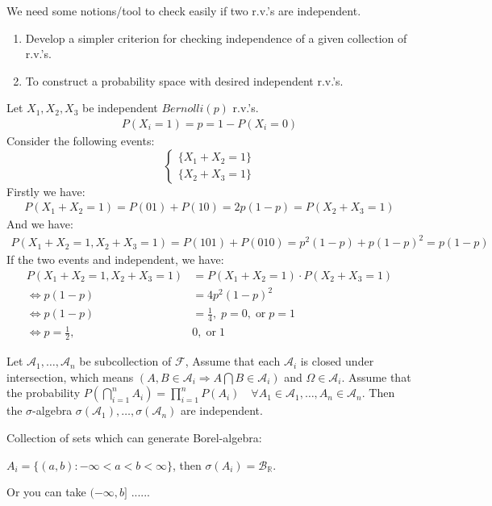 \documentclass[11pt]{article}
\begin{document}
We need some notions/tool to check easily if two r.v.'s are independent.
\begin{enumerate}
    \item Develop a simpler criterion for checking independence of a given collection of r.v.'s.
    \item To construct a probability space with desired independent r.v.'s.
\end{enumerate}

\begin{example}
    Let $X_1, X_2,X_3$ be independent $Bernolli(p)$ r.v.'s.
    \begin{align*}
        P(X_{i} = 1) = p = 1-P(X_{i} = 0)
    \end{align*}
    Consider the following events:
    \begin{equation*}
        \begin{cases} 
        \{X_1 + X_2 = 1\}\\ 
        \{X_2+X_3 = 1 \}  
        \end{cases}
    \end{equation*}
    Firstly we have:
    \begin{align*}
        P(X_1 + X_2 = 1) = P(01) + P(10) = 2p(1-p) = P(X_2+X_3 = 1)
    \end{align*}
    And we have:
    \begin{align*}
        P(X_1+X_2=1, X_2+X_3=1) = P(101) + P(010) = p^{2}(1-p) + p(1-p)^2 = p(1-p)
    \end{align*}
    If the two events and independent, we have:
    \begin{align*}
        P(X_1+X_2=1, X_2+X_3=1) &= P(X_1 + X_2 = 1) \cdot P(X_2+X_3 = 1)\\
        \iff p(1-p) &= 4p^{2}(1-p)^{2} \\
        \iff p(1-p) &= \frac{1}{4}, \; p =0,\; \text{or} \; p=1 \\
        \iff p = \frac{1}{2},\; &0,\; \text{or} \; 1
    \end{align*}
\end{example}


\begin{theorem}
    \label{theorem:2.2}
    Let $\mathcal{A}_{1}, \ldots ,\mathcal{A}_{n}$ be subcollection of $\mathcal{F}$,
    Assume that each $\mathcal{A}_{i}$ is closed under intersection, which means 
    $(A,B \in \mathcal{A}_{i} \Longrightarrow A \bigcap B \in \mathcal{A}_{i})$ and $\Omega \in \mathcal{A}_{i}$.
    Assume that the probability $P(\bigcap_{i=1}^{n} A_{i}) = \prod_{i=1}^{n}P(A_i) \quad
    \forall A_1 \in \mathcal{A}_{1}, \ldots ,A_n \in \mathcal{A}_{n}$. Then the $\sigma$-algebra 
    $\sigma(\mathcal{A}_{1}), \ldots ,\sigma(\mathcal{A}_{n})$ are independent.
\end{theorem}
\begin{example}
    Collection of sets which can generate Borel-algebra:

    $A_i = \{(a,b): -\infty < a < b <\infty\}$, then $\sigma(A_{i}) = \mathcal{B}_{\mathbb{R}}$.

    Or you can take $(-\infty, b]$ ......
\end{example}
\end{document}
